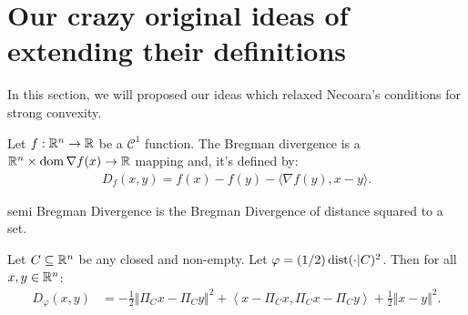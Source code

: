 \documentclass[12pt]{article}
\begin{document}
\section{Our crazy original ideas of extending their definitions}
    In this section, we will proposed our ideas which relaxed Necoara's conditions for strong convexity.
    \begin{definition}\label{def:bd}
        Let $f: \mathbb R^n \rightarrow \mathbb R$ be a $\mathcal C^1$ function. 
        The Bregman divergence is a $\mathbb R^n \times \operatorname{dom} \nabla f(x)\rightarrow \mathbb R$ mapping and, it's defined by:  
        \begin{align*}
            D_f(x, y) = f(x) - f(y) - \langle \nabla f(y), x - y\rangle. 
        \end{align*}
    \end{definition}
    semi Bregman Divergence is the Bregman Divergence of distance squared to a set. 
    \begin{theorem}\label{thm:bd-dist-sq}
        Let $C \subseteq \mathbb R^n$ be any closed and non-empty. 
        Let $\varphi = (1/2)\operatorname{dist}(\cdot | C)^2$.
        Then for all $x, y \in \mathbb R^n$: 
        \begin{align*}
            D_{\varphi}(x, y) 
            &= 
            - \frac{1}{2}\Vert \Pi_C x - \Pi_C y\Vert^2
            + \left\langle x - \Pi_C x, \Pi_C x - \Pi_C y\right\rangle
            + \frac{1}{2} \Vert x - y\Vert^2. 
        \end{align*}
    \end{theorem}
\end{document}
